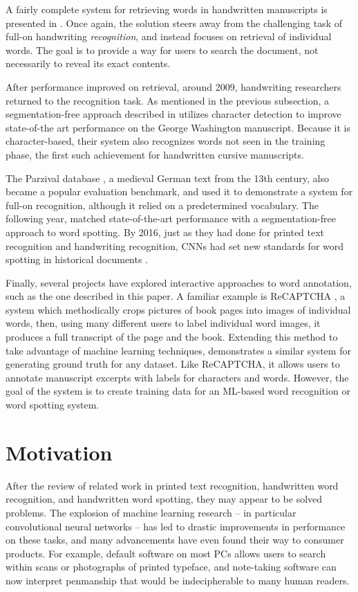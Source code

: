 \documentclass[final]{ukthesis}
\begin{document}
A fairly complete system for retrieving words in handwritten manuscripts is presented in \cite{rath2004search}. Once again, the solution steers away from the challenging task of full-on handwriting {\em recognition}, and instead focuses on retrieval of individual words. The goal is to provide a way for users to search the document, not necessarily to reveal its exact contents.

After performance improved on retrieval, around 2009, handwriting researchers returned to the recognition task. As mentioned in the previous subsection, a segmentation-free approach described in \cite{howe2009finding} utilizes character detection to improve state-of-the art performance on the George Washington manuscript. Because it is character-based, their system also recognizes words not seen in the training phase, the first such achievement for handwritten cursive manuscripts.

The Parzival database \cite{fischer2010ground}, a medieval German text from the 13th century, also became a popular evaluation benchmark, and \cite{fischer2014combined} used it to demonstrate a system for full-on recognition, although it relied on a predetermined vocabulary. The following year, \cite{rusinol2015efficient} matched state-of-the-art performance with a segmentation-free approach to word spotting. By 2016, just as they had done for printed text recognition and handwriting recognition, CNNs had set new standards for word spotting in historical documents \cite{sudholt2016phocnet,zhong2016spottingnet,krishnan2016deep} .

Finally, several projects have explored interactive approaches to word annotation, such as the one described in this paper. A familiar example is ReCAPTCHA \cite{von2008recaptcha}, a system which methodically crops pictures of book pages into images of individual words, then, using many different users to label individual word images, it produces a full transcript of the page and the book. Extending this method to take advantage of machine learning techniques, \cite{biller2013webgt} demonstrates a similar system for generating ground truth for any dataset. Like ReCAPTCHA, it allows users to annotate manuscript excerpts with labels for characters and words. However, the goal of the system is to create training data for an ML-based word recognition or word spotting system.


%
%
\section{Motivation}
After the review of related work in printed text recognition, handwritten word recognition, and handwritten word spotting, they may appear to be solved problems. The explosion of machine learning research -- in particular convolutional neural networks -- has led to drastic improvements in performance on these tasks, and many advancements have even found their way to consumer products. For example, default software on most PCs allows users to search within scans or photographs of printed typeface, and note-taking software can now interpret penmanship that would be indecipherable to many human readers.
\end{document}
